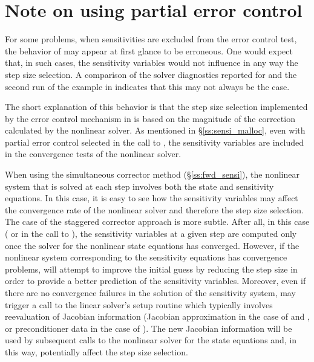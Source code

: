 \section{Note on using partial error control}\label{ss:partial}
For some problems, when sensitivities are excluded from the error control test, 
the behavior of {\cvodes} may appear at first glance to be erroneous. One would
expect that, in such cases, the sensitivity variables would not influence in
any way the step size selection. A comparison of the solver diagnostics 
reported for  and the second run of the  example 
in \cite{cvodes2.3.0_ex} indicates that this may not always be the case.

The short explanation of this behavior is that the step size selection
implemented by the error control mechanism in {\cvodes} is based on the 
magnitude of the correction calculated by the nonlinear solver. As mentioned
in \S\ref{ss:sensi_malloc}, even with partial error control selected
in the call to , the sensitivity variables are included
in the convergence tests of the nonlinear solver.

When using the simultaneous corrector method (\S\ref{ss:fwd_sensi}),
the nonlinear system that is solved at each step involves both the state
and sensitivity equations. In this case, it is easy to see how the sensitivity 
variables may affect the convergence rate of the nonlinear solver and therefore
the step size selection. 
The case of the staggered corrector approach is more subtle. 
After all, in this case ( or  in the call 
to ), the sensitivity variables at a given step are 
computed only once the solver for the nonlinear state equations has converged.
However, if the nonlinear system corresponding to the sensitivity equations
has convergence problems, {\cvodes} will attempt to improve the initial guess
by reducing the step size in order to provide a better prediction of the
sensitivity variables. Moreover, even if there are no convergence failures in
the solution of the sensitivity system, {\cvodes} may trigger a call to the
linear solver's setup routine which typically involves reevaluation of Jacobian
information (Jacobian approximation in the case of {\cvdense} and {\cvband}, or
preconditioner data in the case of {\cvspgmr}). The new Jacobian information
will be used by subsequent calls to the nonlinear solver for the state equations
and, in this way, potentially affect the step size selection.

